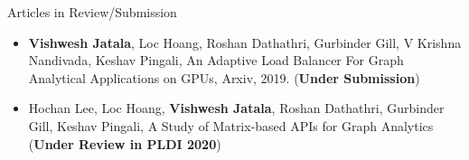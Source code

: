 \documentclass{resume} %
\begin{document}
\begin{rSection}{Articles in Review/Submission}
\begin{itemize}
\item \textbf{Vishwesh Jatala}, Loc Hoang, Roshan Dathathri, Gurbinder Gill, V Krishna Nandivada, Keshav Pingali, An Adaptive Load Balancer For Graph Analytical Applications on GPUs, Arxiv, 2019. (\textbf{Under Submission})
\item Hochan Lee, Loc Hoang, \textbf{Vishwesh Jatala}, Roshan Dathathri, Gurbinder Gill, Keshav Pingali, A Study of Matrix-based APIs for Graph Analytics (\textbf{Under Review in PLDI 2020})

\end{itemize}
\end{rSection}




\begin{comment}
\begin{rSection}{Ph.D Thesis}{\hspace{6 mm}   \textit{Thesis Supervisor : Prof. Amey Karkare, Department of CSE, IIT Kanpur }}

\begin{itemize}
\item \textbf{Title:} Hardware and Software Optimizations for GPU Resource Management
\end{itemize}

\end{rSection}
\end{comment}

\end{document}
